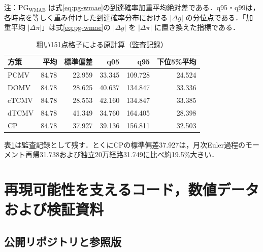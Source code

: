\documentclass[10pt,a4paper]{article}
\theoremstyle{plain}
\theoremstyle{definition}
\begin{document}
\begin{table}[H]
\centering
\caption{月次診断格子上の射影差診断（訂正前の監査記録）}
\label{tab:tcmv-projection-gap}
\begin{flushleft}
\footnotesize 注：$\mathrm{PG}_{\mathrm{WMAE}}$ は式\eqref{eq:pg-wmae}の到達確率加重平均絶対差である．q95・q99は，各時点を等しく重み付けした到達確率分布における $|\Delta g|$ の分位点である．「加重平均 $|\Delta\pi|$」は式\eqref{eq:pg-wmae}の $|\Delta g|$ を $|\Delta\pi|$ に置き換えた指標である．
\end{flushleft}
\end{table}

\begin{table}[H]\centering\scriptsize
\caption{粗い151点格子による原計算（監査記録）}\label{tab:legacy-results-audit}
\begin{tabular}{lrrrrr}\toprule
方策 & 平均 & 標準偏差 & q05 & q95 & 下位5\%平均\\\midrule
PCMV &84.78&22.959&33.345&109.728&24.524\\
DOMV &84.78&28.625&40.637&134.847&33.336\\
cTCMV&84.78&28.553&42.160&134.847&33.385\\
dTCMV&84.78&41.349&34.760&164.405&28.398\\
CP&84.78&37.927&39.136&156.811&32.503\\\bottomrule
\end{tabular}\end{table}
表\ref{tab:legacy-results-audit}は監査記録として残す．とくにCPの標準偏差37.927は，月次Euler過程のモーメント再帰31.738および独立20万経路31.749に比べ約19.5\%大きい．

\clearpage
\section{再現可能性を支えるコード，数値データおよび検証資料}
\label{app:reproducibility}

\subsection{公開リポジトリと参照版}
\end{document}
